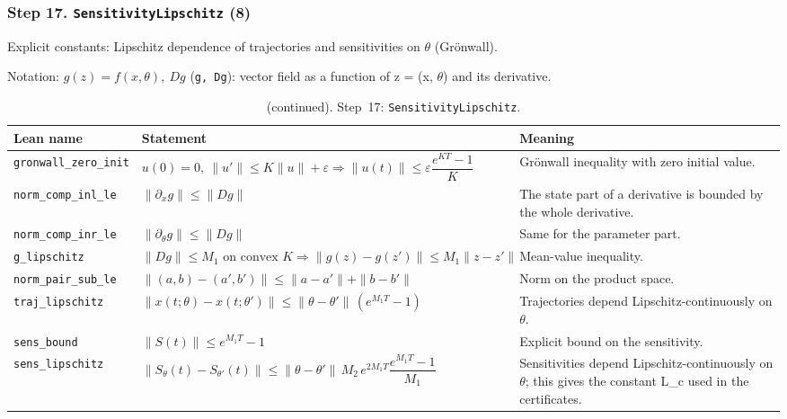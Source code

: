 \subsubsection*{Step 17. \texttt{SensitivityLipschitz} (8)}
Explicit constants: Lipschitz dependence of trajectories and sensitivities on $\theta$ (Gr\"onwall).

{\small\raggedright Notation: $g(z)=f(x,\theta),\ Dg$ (\texttt{g, Dg}): vector field as a function of z = (x, $\theta$) and its derivative.}

\addtocounter{table}{-1}
{\small
\begin{longtable}{@{}>{\raggedright\arraybackslash}p{3.6cm}>{\raggedright\arraybackslash}p{6.6cm}>{\raggedright\arraybackslash}p{5.6cm}@{}}
\caption[]{(continued). Step~17: \texttt{SensitivityLipschitz}.}\\
\toprule
Lean name & Statement & Meaning \\
\midrule
\endhead
\texttt{gronwall\_\allowbreak{}zero\_\allowbreak{}init} & $\displaystyle u(0)=0,\ \|u'\|\le K\|u\|+\varepsilon\Rightarrow\|u(t)\|\le\varepsilon\dfrac{e^{KT}-1}{K}$ & Gr\"onwall inequality with zero initial value. \\[3pt]
\texttt{norm\_\allowbreak{}comp\_\allowbreak{}inl\_\allowbreak{}le} & $\displaystyle \|\partial_x g\|\le\|Dg\|$ & The state part of a derivative is bounded by the whole derivative. \\[3pt]
\texttt{norm\_\allowbreak{}comp\_\allowbreak{}inr\_\allowbreak{}le} & $\displaystyle \|\partial_\theta g\|\le\|Dg\|$ & Same for the parameter part. \\[3pt]
\texttt{g\_\allowbreak{}lipschitz} & $\displaystyle \|Dg\|\le M_1\text{ on convex }K\Rightarrow\|g(z)-g(z')\|\le M_1\|z-z'\|$ & Mean-value inequality. \\[3pt]
\texttt{norm\_\allowbreak{}pair\_\allowbreak{}sub\_\allowbreak{}le} & $\displaystyle \|(a,b)-(a',b')\|\le\|a-a'\|+\|b-b'\|$ & Norm on the product space. \\[3pt]
\texttt{traj\_\allowbreak{}lipschitz} & $\displaystyle \|x(t;\theta)-x(t;\theta')\|\le\|\theta-\theta'\|\,(e^{M_1T}-1)$ & Trajectories depend Lipschitz-continuously on $\theta$. \\[3pt]
\texttt{sens\_\allowbreak{}bound} & $\displaystyle \|S(t)\|\le e^{M_1T}-1$ & Explicit bound on the sensitivity. \\[3pt]
\texttt{sens\_\allowbreak{}lipschitz} & $\displaystyle \|S_\theta(t)-S_{\theta'}(t)\|\le\|\theta-\theta'\|\,M_2\,e^{2M_1T}\dfrac{e^{M_1T}-1}{M_1}$ & Sensitivities depend Lipschitz-continuously on $\theta$; this gives the constant L\_c used in the certificates. \\[3pt]
\bottomrule
\end{longtable}
}

